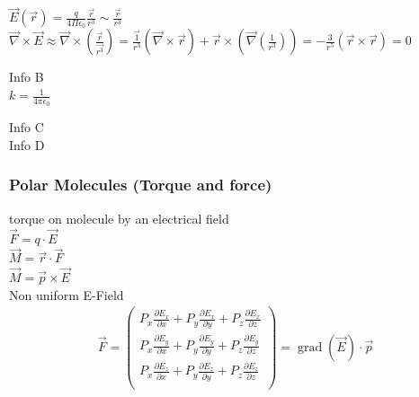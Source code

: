 \documentclass[a4paper]{scrartcl}
\begin{document}
$ \vec{E}(\vec{r})=\frac{q}{4\Pi\epsilon_0}\frac{\vec{r}}{r^3}\sim \frac{\vec{r}}{r^3} $
\\
$ \vec{\nabla}\times\vec{E}\approx\vec{\nabla}\times(\frac{\vec{r}}{\vec{r^3}})=\frac{\vec{1}}{r^3}(\vec{\nabla}\times\vec{r})+\vec{r}\times(\vec{\nabla}(\frac{1}{r^3}))=-\frac{3}{r^5}(\vec{r}\times\vec{r})=0 $

Info B\\
$ k=\frac{1}{4\pi\epsilon_0} $

Info C\\


Info D\\

\subsubsection{Polar Molecules (Torque and force)}

torque on molecule by an electrical field\\

$ \vec{F}=q\cdot\vec{E}$\\

$ \vec{M}=\vec{r}\cdot\vec{F}$\\

$ \vec{M}=\vec{p}\times\vec{E}$\\

Non uniform E-Field\\

\begin{align}
\vec F = \begin{pmatrix}
P_x \frac{\partial E_x}{\partial x} + P_y \frac{\partial E_x}{\partial y} + P_z
\frac{\partial E_x}{\partial z}\\
P_x \frac{\partial E_y}{\partial x} + P_y \frac{\partial E_y}{\partial y} + P_z
\frac{\partial E_y}{\partial z}\\
P_x \frac{\partial E_z}{\partial x} + P_y \frac{\partial E_z}{\partial y} + P_z
\frac{\partial E_z}{\partial z}\\
\end{pmatrix}
= \operatorname{grad} (\vec E) \cdot \vec p
\end{align}
\end{document}
